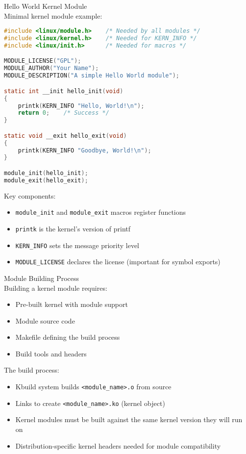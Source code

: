 \begin{code}{Hello World Kernel Module}\\
    Minimal kernel module example:
    
\begin{lstlisting}[language=C, style=basesmol]
#include <linux/module.h>    /* Needed by all modules */
#include <linux/kernel.h>    /* Needed for KERN_INFO */
#include <linux/init.h>      /* Needed for macros */

MODULE_LICENSE("GPL");
MODULE_AUTHOR("Your Name");
MODULE_DESCRIPTION("A simple Hello World module");

static int __init hello_init(void)
{
    printk(KERN_INFO "Hello, World!\n");
    return 0;    /* Success */
}

static void __exit hello_exit(void)
{
    printk(KERN_INFO "Goodbye, World!\n");
}

module_init(hello_init);
module_exit(hello_exit);
\end{lstlisting}

    Key components:
    \begin{itemize}
        \item \texttt{module\_init} and \texttt{module\_exit} macros register functions
        \item \texttt{printk} is the kernel's version of printf
        \item \texttt{KERN\_INFO} sets the message priority level
        \item \texttt{MODULE\_LICENSE} declares the license (important for symbol exports)
    \end{itemize}
\end{code}

\begin{definition}{Module Building Process}\\
    Building a kernel module requires:
    \begin{itemize}
        \item Pre-built kernel with module support
        \item Module source code
        \item Makefile defining the build process
        \item Build tools and headers
    \end{itemize}
    
    The build process:
    \begin{itemize}
        \item Kbuild system builds \texttt{<module\_name>.o} from source
        \item Links to create \texttt{<module\_name>.ko} (kernel object)
        \item Kernel modules must be built against the same kernel version they will run on
        \item Distribution-specific kernel headers needed for module compatibility
    \end{itemize}
\end{definition}


